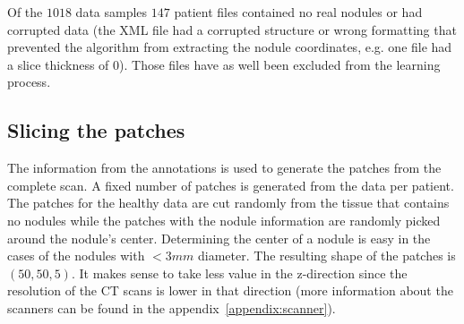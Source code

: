 \documentclass[../Thesis.tex]{subfiles}
\begin{document}
Of the $1018$ data samples $147$ patient files contained no real nodules or had corrupted data (the XML file had a corrupted structure or wrong formatting that prevented the algorithm from extracting the nodule coordinates, e.g. one file had a slice thickness of $0$). Those files have as well been excluded from the learning process.

\subsection{Slicing the patches}
The information from the annotations is used to generate the patches from the complete scan. A fixed number of patches is generated from the data per patient. The patches for the healthy data are cut randomly from the tissue that contains no nodules while the patches with the nodule information are randomly picked around the nodule's center. Determining the center of a nodule is easy in the cases of the nodules with $<3mm$ diameter. The resulting shape of the patches is $(50,50,5)$. It makes sense to take less value in the z-direction since the resolution of the CT scans is lower in that direction (more information about the scanners can be found in the appendix~\ref{appendix:scanner}).
\end{document}
